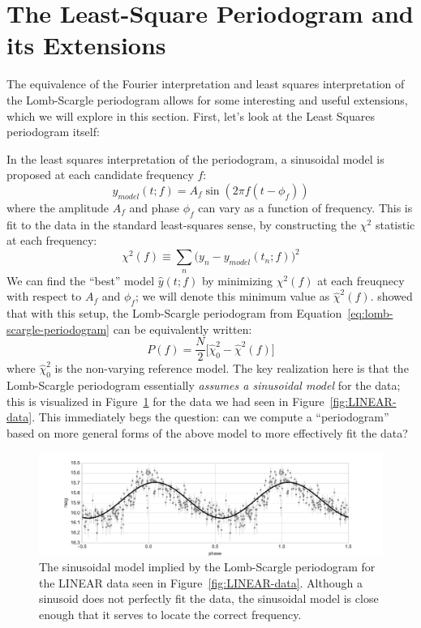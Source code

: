 \documentclass[preprint]{aastex}
\newcommand{\fig}[1]{Figure~\ref{fig:#1}}
\newcommand{\figlabel}[1]{\label{fig:#1}}
\newcommand{\Eq}[1]{Equation~\ref{eq:#1}}
\newcommand{\eq}[1]{\Eq{#1}}
\newcommand{\eqlabel}[1]{\label{eq:#1}}
\newcommand{\sectlabel}[1]{\label{sect:#1}}
\begin{document}
\section{The Least-Square Periodogram and its Extensions}
\sectlabel{lomb-scargle-extensions}

The equivalence of the Fourier interpretation and least squares interpretation of the Lomb-Scargle periodogram allows for some interesting and useful
extensions, which we will explore in this section.
First, let's look at the Least Squares periodogram itself:

In the least squares interpretation of the periodogram, a sinusoidal model is proposed at each candidate frequency $f$:
\begin{equation}
  y_{model}(t;f) = A_f \sin(2 \pi f (t - \phi_f))
\end{equation}
where the amplitude $A_f$ and phase $\phi_f$ can vary as a function of frequency.
This is fit to the data in the standard least-squares sense, by constructing
the $\chi^2$ statistic at each frequency:
\begin{equation}
  \chi^2(f) \equiv \sum_n \big(y_n - y_{model}(t_n;f)\big)^2
  \eqlabel{chi2-simple}
\end{equation}
We can find the ``best'' model $\hat{y}(t;f)$ by minimizing $\chi^2(f)$ at
each freuqnecy with respect to $A_f$ and $\phi_f$;
we will denote this minimum value as $\hat{\chi}^2(f)$.
\citet{Scargle82} showed that with this setup, the Lomb-Scargle
periodogram from \eq{lomb-scargle-periodogram} can be equivalently written:
\begin{equation}
  P(f) = \frac{N}{2}\big[\hat{\chi}^2_0 - \hat{\chi}^2(f)\big]
  \eqlabel{lomb-scargle-chi2}
\end{equation}
where $\hat{\chi}^2_0$ is the non-varying reference model.
The key realization here is that the Lomb-Scargle periodogram essentially
{\it assumes a sinusoidal model} for the data; this is visualized in
\fig{ls-model} for the data we had seen in \fig{LINEAR-data}.
This immediately begs the question: can we compute a ``periodogram'' based
on more general forms of the above model to more effectively fit the data?

\begin{figure}[ht]
  \centering
  \includegraphics[width=\textwidth]{fig18_ls_model}
  \caption{The sinusoidal model implied by the Lomb-Scargle periodogram for
    the LINEAR data seen in \fig{LINEAR-data}.
    Although a sinusoid does not perfectly fit the data, the sinusoidal model
    is close enough that it serves to locate the correct frequency.
    \figlabel{ls-model}}
\end{figure}
\end{document}
